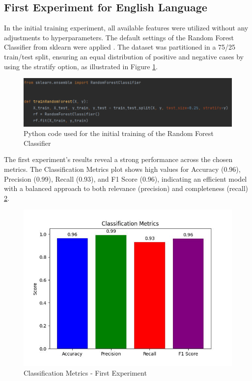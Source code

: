 \subsection{First Experiment for English Language}

\quad In the initial training experiment, all available features were utilized without any adjustments to hyperparameters. The default settings of the Random Forest Classifier from sklearn were applied \cite{sklearn_api}. The dataset was partitioned in a 75/25 train/test split, ensuring an equal distribution of positive and negative cases by using the stratify option, as illustrated in Figure \ref{codeTrainRF}.

\begin{figure}[htbp]
	\centering
		\includegraphics[scale=0.6]{LaTeX Bachelor Thesis Depression Signs Detection/figures/codeTrainingRF.png}
	\caption{Python code used for the initial training of the Random Forest Classifier}
	\label{codeTrainRF}
\end{figure}

The first experiment's results reveal a strong performance across the chosen metrics. The Classification Metrics plot shows high values for Accuracy (0.96), Precision (0.99), Recall (0.93), and F1 Score (0.96), indicating an efficient model with a balanced approach to both relevance (precision) and completeness (recall) \ref{classificationMetricsFirstExperiment}.

\begin{figure}[htbp]
	\centering
		\includegraphics[scale=0.8]{LaTeX Bachelor Thesis Depression Signs Detection/figures/metrics/experiment1English/classificationMetrics.jpg}
	\caption{Classification Metrics - First Experiment}
	\label{classificationMetricsFirstExperiment}
\end{figure}

